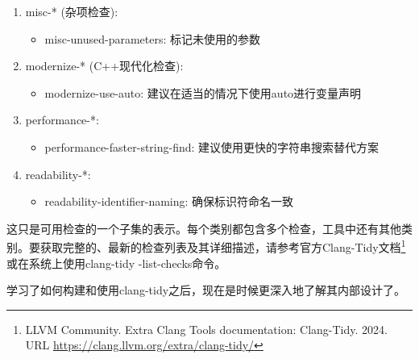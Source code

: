 \begin{enumerate}
\item
misc-* (杂项检查):

\begin{itemize}
\item
misc-unused-parameters: 标记未使用的参数
\end{itemize}

\item
modernize-* (C++现代化检查):

\begin{itemize}
\item
modernize-use-auto: 建议在适当的情况下使用auto进行变量声明
\end{itemize}

\item
performance-*:

\begin{itemize}
\item
performance-faster-string-find: 建议使用更快的字符串搜索替代方案
\end{itemize}

\item
readability-*:

\begin{itemize}
\item
readability-identifier-naming: 确保标识符命名一致
\end{itemize}
\end{enumerate}

这只是可用检查的一个子集的表示。每个类别都包含多个检查，工具中还有其他类别。要获取完整的、最新的检查列表及其详细描述，请参考官方Clang-Tidy文档\footnote{LLVM Community. Extra Clang Tools documentation: Clang-Tidy. 2024. URL \url{https://clang.llvm.org/extra/clang-tidy/}}或在系统上使用clang-tidy -list-checks命令。

学习了如何构建和使用clang-tidy之后，现在是时候更深入地了解其内部设计了。























